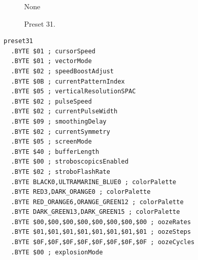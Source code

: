\begin{minipage}[b]{0.48\linewidth}
\begin{figure}[H]                                                          
  \centering                                                             
  \begin{adjustbox}{width=5cm,center}                                   
None
  \end{adjustbox}                                                        
\caption*{Preset 31.}                                           
\end{figure}                                                               
\end{minipage}
\hspace{0.1cm}
\begin{minipage}[b]{0.48\linewidth}                                       
\begin{lstlisting}[basicstyle=\ttfamily\tiny]
preset31
  .BYTE $01 ; cursorSpeed
  .BYTE $01 ; vectorMode
  .BYTE $02 ; speedBoostAdjust
  .BYTE $0B ; currentPatternIndex
  .BYTE $05 ; verticalResolutionSPAC
  .BYTE $02 ; pulseSpeed
  .BYTE $02 ; currentPulseWidth
  .BYTE $09 ; smoothingDelay
  .BYTE $02 ; currentSymmetry
  .BYTE $05 ; screenMode
  .BYTE $40 ; bufferLength
  .BYTE $00 ; stroboscopicsEnabled
  .BYTE $02 ; stroboFlashRate
  .BYTE BLACK0,ULTRAMARINE_BLUE0 ; colorPalette
  .BYTE RED3,DARK_ORANGE0 ; colorPalette
  .BYTE RED_ORANGE6,ORANGE_GREEN12 ; colorPalette
  .BYTE DARK_GREEN13,DARK_GREEN15 ; colorPalette
  .BYTE $00,$00,$00,$00,$00,$00,$00,$00 ; oozeRates
  .BYTE $01,$01,$01,$01,$01,$01,$01,$01 ; oozeSteps
  .BYTE $0F,$0F,$0F,$0F,$0F,$0F,$0F,$0F ; oozeCycles
  .BYTE $00 ; explosionMode
\end{lstlisting}
\end{minipage}

